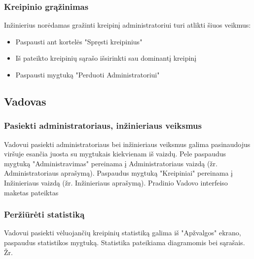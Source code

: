 	\subsubsection{Kreipinio grąžinimas}
	
	Inžinierius norėdamas gražinti kreipinį administratoriui turi atlikti šiuos veikmus:
	
	\begin{itemize}
		\item Paspausti ant kortelės "Spręsti kreipinius" 
		\item Iš pateikto kreipinių sąrašo išsirinkti sau dominantį kreipinį 
		\item Paspausti mygtuką "Perduoti Administratoriui" 
	\end{itemize}

\subsection{Vadovas}

	\subsubsection{Pasiekti administratoriaus, inžinieriaus veiksmus}
		
	
	Vadovui pasiekti administratoriaus bei inžinieriaus veiksmus galima pasinaudojus viršuje esančia juosta su mygtukais kiekvienam iš vaizdų.
	Pele paspaudus mygtuką "Administravimas" pereinama į Administratoriaus vaizdą (žr. Administratoriaus aprašymą).
	Paspaudus mygtuką "Kreipiniai" pereinama į Inžinieriaus vaizdą (žr. Inžinieriaus aprašymą).
	Pradinio Vadovo interfeiso maketas pateiktas 
	
	\subsubsection{Peržiūrėti statistiką}	
	
	
	Vadovui pasiekti vėluojančių kreipinių statistiką galima iš "Apžvalgos" ekrano, paspaudus statistikos mygtuką.
	Statistika pateikiama diagramomis bei sąrašais. Žr. 
	
